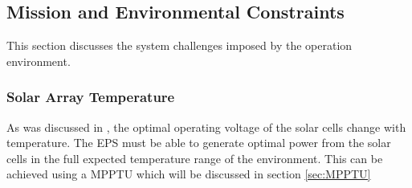 \subsection{Mission and Environmental Constraints}
\label{subsec:environmental_requirements}
This section discusses the system challenges imposed by the operation environment.
%
\subsubsection*{Solar Array Temperature}
As was discussed in \cite{PDR}, the optimal operating voltage of the solar cells change with temperature. The \ac{EPS} must be able to generate optimal power from the solar cells in the full expected temperature range of the environment. This can be achieved using a \ac{MPPTU} which will be discussed in section \ref{sec:MPPTU}
%
